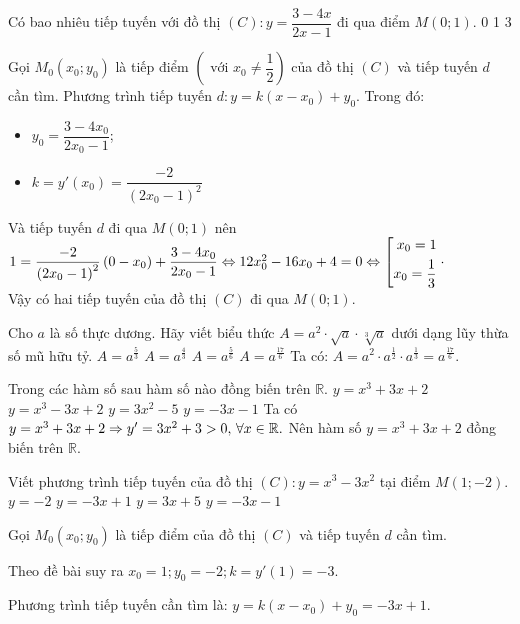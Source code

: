 \begin{ex}%
Có bao nhiêu tiếp tuyến với đồ thị $ (C): y = \dfrac{3-4x}{2x-1} $	đi qua điểm $ M(0;1). $
		\choice
	{0}
	{1}
	{}
	{3}
	\loigiai
	{	
Gọi $ M_0(x_0;y_0) $	 là tiếp điểm $ \left( \text{ với }  x_0 \neq \dfrac{1}{2} \right)$ của đồ thị $ (C) $ và tiếp tuyến $ d $ cần tìm.
Phương trình tiếp tuyến $ d: y = k(x - x_0) + y_0 $. Trong đó:
	\begin{itemize}
		\item $ y_0 = \dfrac{3-4x_0}{2x_0 - 1} $;
		\item $ k = y'(x_0) = \dfrac{-2}{\left(2x_0-1\right)^2} $
	\end{itemize} 
	Và tiếp tuyến $ d $ đi qua $ M(0;1) $ nên $ 1 = \dfrac{-2}{\left(2x_0-1\right)^2} \left(0 - x_0\right) +\dfrac{3-4x_0}{2x_0 - 1}  \\
	\Leftrightarrow 12x_0^2 - 16x_0 + 4 = 0 \Leftrightarrow \left[\begin{aligned}x_0 = 1\\x_0 = \dfrac{1}{3}\end{aligned}\right. \cdot$\\
Vậy có hai tiếp tuyến của đồ thị $ (C) $ đi qua $ M(0;1). $
	}
\end{ex}
\begin{ex}%
	Cho $ a $ là số thực dương. Hãy viết biểu thức $ A = a^2 \cdot \sqrt{a} \cdot \sqrt[3]{a} $ dưới dạng lũy thừa số mũ hữu tỷ.
		\choice
	{$ A = a^{\tfrac{5}{3}} $}
	{$ A = a^{\tfrac{4}{3}} $}
	{$ A = a^{\tfrac{5}{6}} $}
	{\True $ A = a^{\tfrac{17}{6}} $}
	\loigiai
	{	
		Ta có: $ A = a^2 \cdot a^{\tfrac{1}{2}} \cdot a^{\tfrac{1}{3}} =  a^{\tfrac{17}{6}}.$
	}
\end{ex}
\begin{ex}%
	Trong các hàm số sau hàm số nào đồng biến trên $ \mathbb{R}. $
		\choice
	{\True $ y = x^3 + 3x + 2 $}
	{$ y = x^3 - 3x + 2 $}
	{$ y = 3x^2 - 5 $}
	{$ y = -3x - 1 $}
	\loigiai
	{	
	Ta có $ y = x^3 + 3x + 2 \Rightarrow y' = 3x^2 + 3 >0,\, \forall x \in \mathbb{R}.\\ $	
	Nên hàm số $ y = x^3 + 3x + 2 $ đồng biến trên $ \mathbb{R}. $
	}
\end{ex}
\begin{ex}%
	Viết phương trình tiếp tuyến của đồ thị $ (C): y = x^3 - 3x^2 $ tại điểm $ M(1;-2). $
		\choice
	{$ y = -2 $}
	{\True $ y = -3x + 1 $}
	{$ y = 3x + 5 $}
	{$ y = -3x - 1 $}
	\loigiai
	{	
	
	Gọi $ M_0(x_0;y_0) $	 là tiếp điểm của đồ thị $ (C) $ và tiếp tuyến $ d $ cần tìm.	
	
	Theo đề bài suy ra $ x_0 = 1; y_0 = -2; k = y'(1) = -3. $
	
	Phương trình tiếp tuyến cần tìm là: $ y = k(x-x_0)+y_0 = -3x +1. $
	}
\end{ex}

